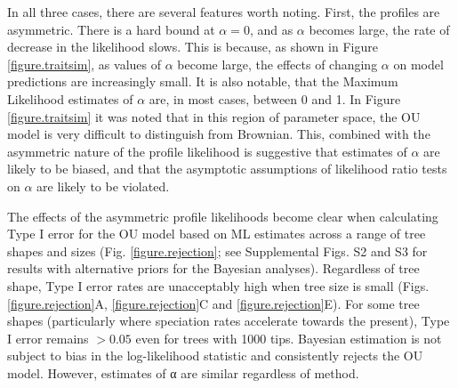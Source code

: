 \documentclass[a4paper,12pt]{article}
\begin{document}

In all three cases, there are several features worth noting. First, the profiles are asymmetric. There is a hard bound at $\alpha = 0$, and as $\alpha$ becomes large, the rate of decrease in the likelihood slows. This is because, as shown in Figure \ref{figure.traitsim}, as values of $\alpha$ become large, the effects of changing $\alpha$ on model predictions are increasingly small. It is also notable, that the Maximum Likelihood estimates of $\alpha$ are, in most cases, between 0 and 1. In Figure \ref{figure.traitsim} it was noted that in this region of parameter space, the OU model is very difficult to distinguish from Brownian. This, combined with the asymmetric nature of the profile likelihood is suggestive that estimates of $\alpha$ are likely to be biased, and that the asymptotic assumptions of likelihood ratio tests on $\alpha$ are likely to be violated.

The effects of the asymmetric profile likelihoods become clear when calculating Type I error for the OU model based on ML estimates across a range of tree shapes and sizes (Fig. \ref{figure.rejection}; see Supplemental Figs. S2 and S3 for results with alternative priors for the Bayesian analyses). Regardless of tree shape, Type I error rates are unacceptably high when tree size is small (Figs. \ref{figure.rejection}A, \ref{figure.rejection}C and \ref{figure.rejection}E). For some tree shapes (particularly where speciation rates accelerate towards the present), Type I error remains $>0.05$ even for trees with 1000 tips. Bayesian estimation is not subject to bias in the log-likelihood statistic and consistently rejects the OU model. However, estimates of α are similar regardless of method.

\end{document}
